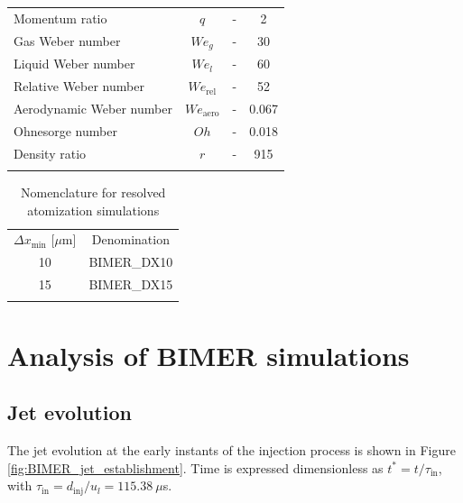 \begin{table}[!h]
\begin{tabular}{lccc}
Momentum ratio & $q$ & - & 2 \\ %
Gas Weber number & $We_g$ & - & 30 \\ %
Liquid Weber number & $We_l$ & - & 60 \\
Relative Weber number & $We_\mathrm{rel}$ & - & 52 \\ %
Aerodynamic Weber number & $We_\mathrm{aero}$ & - & 0.067 \\
Ohnesorge number & $Oh $ & - & 0.018 \\
Density ratio & $r$ & - & 915 \\
\thickhline
\end{tabular}
\label{tab:bimer_sps_operating_point}
\end{table}

\begin{table}[!h]
\centering
\caption{Nomenclature for resolved atomization simulations}
\begin{tabular}{cc}
\thickhline
$\Delta x_\mathrm{min}$ [$\mu$m]  &  Denomination \\ 
\thickhline
10 & BIMER\_DX10 \\
15 & BIMER\_DX15 \\
\thickhline
\end{tabular}
\label{tab:BIMER_resolved_simulations_performed}
\end{table}



\section{Analysis of BIMER simulations}
\label{sec:ch8_BIMER_physical_analysis}



\subsection{Jet evolution}
\label{subsec:ch8_BIMER_jet_evolution}

The jet evolution at the early instants of the injection process is shown in Figure \ref{fig:BIMER_jet_establishment}. Time is expressed dimensionless as $t^* = t / \tau_\mathrm{in}$, with $\tau_\mathrm{in} = d_\mathrm{inj}/u_l = 115.38~\mu$s. 

